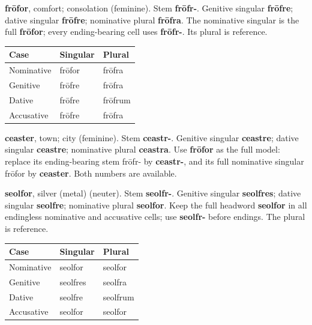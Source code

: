 \textbf{frōfor}, comfort; consolation (feminine). Stem \textbf{frōfr-}. Genitive singular \textbf{frōfre}; dative singular \textbf{frōfre}; nominative plural \textbf{frōfra}. The nominative singular is the full \textbf{frōfor}; every ending-bearing cell uses \textbf{frōfr-}. Its plural is reference.

\par\begingroup
\fontsize{10.5}{13.2}\selectfont
\setlength{\LTleft}{0pt}\setlength{\LTright}{\fill}
\noindent
\begin{tabular}{@{}>{\raggedright\arraybackslash}p{39.46mm}>{\raggedright\arraybackslash}p{39.46mm}>{\raggedright\arraybackslash}p{39.46mm}@{}}
\toprule
\textbf{Case} & \textbf{Singular} & \textbf{Plural} \\
\midrule
Nominative & frōfor & frōfra \\
Genitive & frōfre & frōfra \\
Dative & frōfre & frōfrum \\
Accusative & frōfre & frōfra \\
\bottomrule
\end{tabular}
\par\endgroup

\textbf{ceaster}, town; city (feminine). Stem \textbf{ceastr-}. Genitive singular \textbf{ceastre}; dative singular \textbf{ceastre}; nominative plural \textbf{ceastra}. Use \textbf{frōfor} as the full model: replace its ending-bearing stem frōfr- by \textbf{ceastr-}, and its full nominative singular frōfor by \textbf{ceaster}. Both numbers are available.

\textbf{seolfor}, silver (metal) (neuter). Stem \textbf{seolfr-}. Genitive singular \textbf{seolfres}; dative singular \textbf{seolfre}; nominative plural \textbf{seolfor}. Keep the full headword \textbf{seolfor} in all endingless nominative and accusative cells; use \textbf{seolfr-} before endings. The plural is reference.

\par\begingroup
\fontsize{10.5}{13.2}\selectfont
\setlength{\LTleft}{0pt}\setlength{\LTright}{\fill}
\noindent
\begin{tabular}{@{}>{\raggedright\arraybackslash}p{39.46mm}>{\raggedright\arraybackslash}p{39.46mm}>{\raggedright\arraybackslash}p{39.46mm}@{}}
\toprule
\textbf{Case} & \textbf{Singular} & \textbf{Plural} \\
\midrule
Nominative & seolfor & seolfor \\
Genitive & seolfres & seolfra \\
Dative & seolfre & seolfrum \\
Accusative & seolfor & seolfor \\
\bottomrule
\end{tabular}
\par\endgroup

